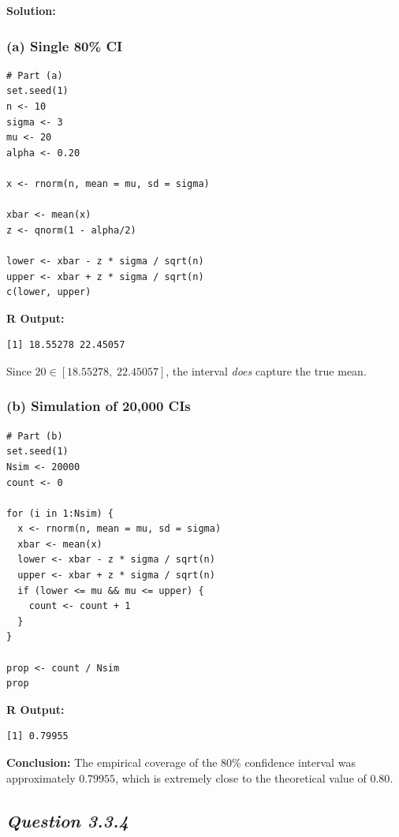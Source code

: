 \documentclass[11pt,letterpaper]{article}
\theoremstyle{remark}
\begin{document}
\vspace{1cm}

\textbf{Solution:}

\subsubsection*{(a) Single 80\% CI}

\begin{verbatim}
# Part (a)
set.seed(1)
n <- 10
sigma <- 3
mu <- 20
alpha <- 0.20

x <- rnorm(n, mean = mu, sd = sigma)

xbar <- mean(x)
z <- qnorm(1 - alpha/2)

lower <- xbar - z * sigma / sqrt(n)
upper <- xbar + z * sigma / sqrt(n)
c(lower, upper)
\end{verbatim}

\textbf{R Output:}

\begin{verbatim}
[1] 18.55278 22.45057
\end{verbatim}

Since $20 \in [18.55278,\; 22.45057]$, the interval \emph{does} capture the true mean.

\medskip

\subsubsection*{(b) Simulation of 20,000 CIs}

\begin{verbatim}
# Part (b)
set.seed(1)
Nsim <- 20000
count <- 0

for (i in 1:Nsim) {
  x <- rnorm(n, mean = mu, sd = sigma)
  xbar <- mean(x)
  lower <- xbar - z * sigma / sqrt(n)
  upper <- xbar + z * sigma / sqrt(n)
  if (lower <= mu && mu <= upper) {
    count <- count + 1
  }
}

prop <- count / Nsim
prop
\end{verbatim}

\textbf{R Output:}

\begin{verbatim}
[1] 0.79955
\end{verbatim}

\textbf{Conclusion:}
The empirical coverage of the 80\% confidence interval was approximately $0.79955$,
which is extremely close to the theoretical value of $0.80$.

\newpage

\subsection*{\textbf{\textit{Question 3.3.4}}}
\end{document}
